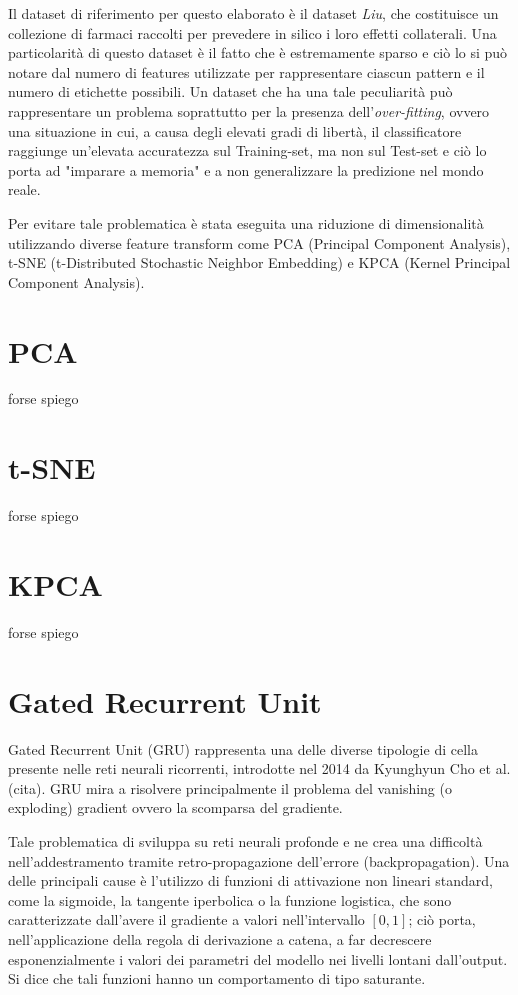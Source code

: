 Il dataset di riferimento per questo elaborato è il dataset \textit{Liu}, che costituisce un collezione di farmaci raccolti per prevedere in silico i loro effetti collaterali. Una particolarità di questo dataset è il fatto che è estremamente sparso e ciò lo si può notare dal numero di features utilizzate per rappresentare ciascun pattern e il numero di etichette possibili. Un dataset che ha una tale peculiarità può rappresentare un problema soprattutto per la presenza dell'\textit{over-fitting}, ovvero una situazione in cui, a causa degli elevati gradi di libertà, il classificatore raggiunge un'elevata accuratezza sul Training-set, ma non sul Test-set e ciò lo porta ad "imparare a memoria" e a non generalizzare la predizione nel mondo reale.

Per evitare tale problematica è stata eseguita una riduzione di dimensionalità utilizzando diverse feature transform come PCA (Principal Component Analysis), t-SNE (t-Distributed Stochastic Neighbor Embedding) e KPCA (Kernel Principal Component Analysis).

\section{PCA}
forse spiego

\section{t-SNE}
forse spiego

\section{KPCA}
forse spiego

\section{Gated Recurrent Unit}
Gated Recurrent Unit (GRU) rappresenta una delle diverse tipologie di cella presente nelle reti neurali ricorrenti, introdotte nel 2014 da Kyunghyun Cho et al. (cita). GRU mira a risolvere principalmente il problema del vanishing (o exploding) gradient ovvero la scomparsa del gradiente. 

Tale problematica di sviluppa su reti neurali profonde e ne crea una difficoltà nell'addestramento tramite retro-propagazione dell'errore (backpropagation). Una delle principali cause è l'utilizzo di funzioni di attivazione non lineari standard, come la sigmoide, la tangente iperbolica o la funzione logistica, che sono caratterizzate dall'avere il gradiente a valori nell'intervallo $[0,1]$; ciò porta, nell'applicazione della regola di derivazione a catena, a far decrescere esponenzialmente i valori dei parametri del modello nei livelli lontani dall'output. Si dice che tali funzioni hanno un comportamento di tipo saturante.

